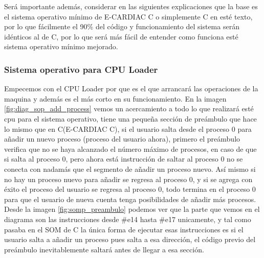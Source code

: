 \documentclass[letterpaper,12pt,oneside]{book}
\begin{document}
			Será importante además, considerar en las siguientes explicaciones que la base es el sistema operativo mínimo de E-CARDIAC C o simplemente C en esté texto, por
			lo que fácilmente el 90\% del código y funcionamiento del sistema serán idénticos al de C, por lo que será más fácil de entender como funciona esté
			sistema operativo mínimo mejorado.

	 	
		 	\subsubsection{ Sistema operativo para CPU Loader }
		 	
		 		Empecemos con el CPU Loader por que es el que arrancará las operaciones de la maquina y además es el más corto en su funcionamiento. En
		 		la imagen \ref{fig:diag_sop_add_process} vemos un acercamiento a todo lo que realizará esté cpu para el sistema operativo, tiene una pequeña
		 		sección de preámbulo que hace lo mismo que en C(E-CARDIAC C), si el usuario salta desde el proceso 0 para añadir un nuevo proceso (proceso del usuario 
		 		ahora), primero el preámbulo verifica que no se haya alcanzado el número máximo de procesos, en caso de que si salta al proceso 0, pero ahora está 
		 		instrucción de saltar al proceso 0 no se conecta con nadamás que el segmento de añadir un proceso nuevo. Así mismo si no hay 
		 		un proceso nuevo para añadir se regresa al proceso 0, y si se agrega con éxito el proceso del usuario se regresa al proceso 0, todo termina
		 		en el proceso 0 para que el usuario de nueva cuenta tenga posibilidades de añadir más procesos. Desde la imagen \ref{fig:somp_preambulo} podemos
		 		ver que la parte que vemos en el diagrama son las instrucciones desde \#e14 hasta \#e17 unicamente, y tal como pasaba en el SOM de C la única
		 		forma de ejecutar esas instrucciones es si el usuario salta a añadir un proceso pues salta a esa dirección, el código previo del preámbulo
		 		inevitablemente saltará antes de llegar a esa sección.
		 		
\end{document}

